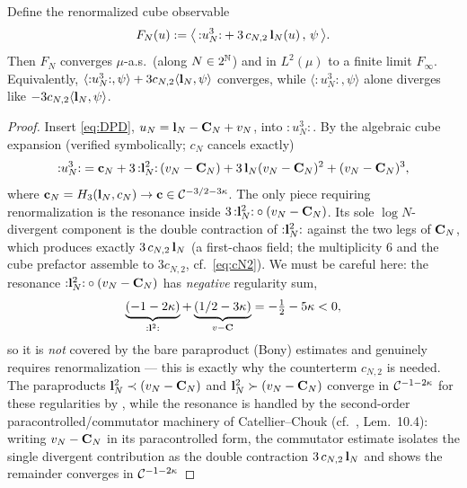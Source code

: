 \begin{qonelemma}\label{lem:cancel}
Define the renormalized cube observable
\begin{equation}\label{eq:FN}
F_N(u):=\bigl\langle\,{:}u_N^3{:}+3\,c_{N,2}\,\mathbf{l}_N(u)\,,\,\psi\,\bigr\rangle .
\end{equation}
Then $F_N$ converges $\mu$-a.s.\ (along $N\in2^{\mathbb{N}}$) and in $L^2(\mu)$ to a finite
limit $F_\infty$. Equivalently, $\langle{:}u_N^3{:},\psi\rangle+3c_{N,2}\langle\mathbf{l}_N,\psi\rangle$
converges, while $\langle{:}u_N^3{:},\psi\rangle$ alone diverges like
$-3c_{N,2}\langle\mathbf{l}_N,\psi\rangle$.
\end{qonelemma}
\begin{proof}
Insert \eqref{eq:DPD}, $u_N=\mathbf{l}_N-\mathbf{C}_N+v_N$, into ${:}u_N^3{:}$. By the
algebraic cube expansion (verified symbolically; $c_N$ cancels exactly)
\begin{equation}\label{eq:cubeexp}
{:}u_N^3{:}=\mathbf{c}_N+3\,{:}\mathbf{l}_N^2{:}\,(v_N-\mathbf{C}_N)+3\,\mathbf{l}_N(v_N-\mathbf{C}_N)^2+(v_N-\mathbf{C}_N)^3,
\end{equation}
where $\mathbf{c}_N=H_3(\mathbf{l}_N,c_N)\to\mathbf{c}\in\mathcal{C}^{-3/2-3\kappa}$. The only
piece requiring renormalization is the resonance inside
$3\,{:}\mathbf{l}_N^2{:}\circ(v_N-\mathbf{C}_N)$. Its sole $\log N$-divergent component is
the double contraction of ${:}\mathbf{l}_N^2{:}$ against the two legs of $\mathbf{C}_N$,
which produces exactly $3\,c_{N,2}\,\mathbf{l}_N$ (a first-chaos field; the multiplicity
$6$ and the cube prefactor assemble to $3c_{N,2}$, cf.\ \eqref{eq:cN2}). We must be
careful here: the resonance ${:}\mathbf{l}_N^2{:}\circ(v_N-\mathbf{C}_N)$ has \emph{negative}
regularity sum,
\[
\underbrace{(-1-2\kappa)}_{{:}\mathbf{l}^2{:}}+\underbrace{(1/2-3\kappa)}_{v-\mathbf{C}}
=-\tfrac12-5\kappa<0,
\]
so it is \emph{not} covered by the bare paraproduct (Bony) estimates and genuinely
requires renormalization --- this is exactly why the counterterm $c_{N,2}$ is needed. The
paraproducts $\mathbf{l}_N^2\prec(v_N-\mathbf{C}_N)$ and
$\mathbf{l}_N^2\succ(v_N-\mathbf{C}_N)$ converge in $\mathcal{C}^{-1-2\kappa}$ for these
regularities by \cite{GIP15}, while the resonance is handled by the second-order
paracontrolled/commutator machinery of Catellier--Chouk \cite{CC18} (cf.\ \cite{GIP15},
Lem.~10.4): writing $v_N-\mathbf{C}_N$ in its paracontrolled form, the commutator estimate
isolates the single divergent contribution as the double contraction
$3\,c_{N,2}\,\mathbf{l}_N$ and shows the remainder converges in $\mathcal{C}^{-1-2\kappa}$

\end{proof}
